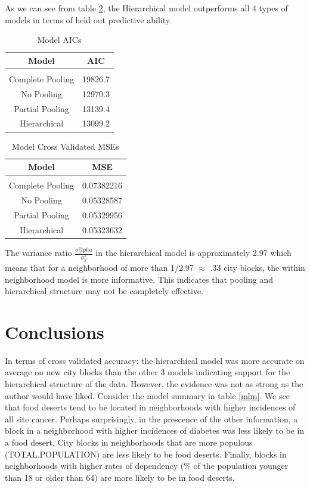 \documentclass{report}
\begin{document}
As we can see from table \ref{MSEs}, the Hierarchical model outperforms all 4 types of models in terms of held out predictive ability. 

\begin{table}[!htbp] \centering
  \caption{Model AICs}
  \label{AICs}
  \begin{tabular}[c]{c|c}
\\    Model & AIC \\
    \hline \\
    Complete Pooling & 19826.7 \\
    No Pooling & 12970.3 \\
    Partial Pooling & 13139.4 \\
    Hierarchical & 13099.2 \\
  \end{tabular}
\end{table}

\begin{table}[!htbp] \centering
  \caption{Model Cross Validated MSEs}
  \label{MSEs}
  \begin{tabular}[c]{c|c}
\\    Model & MSE \\
    \hline \\
    Complete Pooling & 0.07382216 \\
    No Pooling &  0.05328587 \\
    Partial Pooling & 0.05329956 \\
    Hierarchical & 0.05323632 \\
  \end{tabular}
\end{table}

The variance ratio $\frac{\sigma^2_alpha}{\sigma^2_y}$ in the hierarchical model is approximately 2.97 which means that for a neighborhood of more than 1/2.97 $\approx$ .33 city blocks, the within neighborhood model is more informative. This indicates that pooling and hierarchical structure may not be completely effective. 

\section*{Conclusions}

In terms of cross validated accuracy: the hierarchical model was more accurate on average on new city blocks than the other 3 models indicating support for the hierarchical structure of the data. However, the evidence was not as strong as the author would have liked. Consider the model summary in table \ref{mlm}. We see that food deserts tend to be located in neighborhoods with higher incidences of all site cancer. Perhaps surprisingly, in the prescence of the other information, a block in a neighborhood with higher incidences of diabetes was less likely to be in a food desert. City blocks in neighborhoods that are more populous (TOTAL.POPULATION) are less likely to be food deserts. Finally, blocks in neighborhoods with higher rates of dependency (\% of the population younger than 18 or older than 64) are more likely to be in food deserts.
\end{document}
